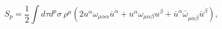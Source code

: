 \begin{equation}\label{16}
S_p=\frac12\int d\tau d^p\sigma\ \rho^\mu 
\left(2u^\alpha\omega_{\mu\alpha\dot\alpha}\bar 
u^{\dot\alpha}+u^\alpha\omega_{\mu\alpha\beta}u^\beta+\bar 
u^{\dot\alpha}\bar\omega_{\mu\dot\alpha\dot\beta}\bar u^{\dot\beta}\right),
\end{equation}

